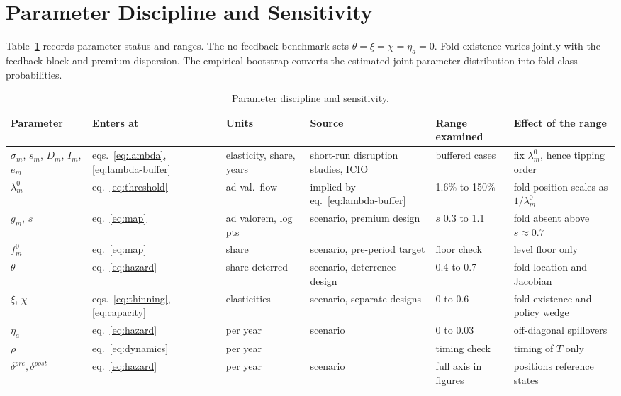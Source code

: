 \documentclass[11pt]{article}
\theoremstyle{definition}
\begin{document}
\section{Parameter Discipline and Sensitivity}\label{app:params}

Table~\ref{tab:params3} records parameter status and ranges. The no-feedback benchmark sets $\theta=\xi=\chi=\eta_a=0$. Fold existence varies jointly with the feedback block and premium dispersion. The empirical bootstrap converts the estimated joint parameter distribution into fold-class probabilities.

\begin{table}[h]
\centering
\caption{Parameter discipline and sensitivity.}
\label{tab:params3}
\footnotesize
\setlength{\tabcolsep}{3.5pt}
\begin{tabular}{p{2.2cm}p{1.7cm}p{1.5cm}p{2.9cm}p{1.9cm}p{3.2cm}}
\toprule
Parameter & Enters at & Units & Source & Range examined & Effect of the range \\
\midrule
$\sigma_m$, $s_m$, $D_m$, $I_m$, $e_m$ & eqs.~\eqref{eq:lambda}, \eqref{eq:lambda-buffer} & elasticity, share, years & short-run disruption studies, ICIO & buffered cases & fix $\lambda^0_m$, hence tipping order \\
$\lambda^0_m$ & eq.~\eqref{eq:threshold} & ad val.\ flow & implied by eq.~\eqref{eq:lambda-buffer} & 1.6\% to 150\% & fold position scales as $1/\lambda^0_m$ \\
$\bar g_m$, $s$ & eq.~\eqref{eq:map} & ad valorem, log pts & scenario, premium design & $s$ 0.3 to 1.1 & fold absent above $s\approx0.7$ \\
$f^0_m$ & eq.~\eqref{eq:map} & share & scenario, pre-period target & floor check & level floor only \\
$\theta$ & eq.~\eqref{eq:hazard} & share deterred & scenario, deterrence design & 0.4 to 0.7 & fold location and Jacobian \\
$\xi$, $\chi$ & eqs.~\eqref{eq:thinning}, \eqref{eq:capacity} & elasticities & scenario, separate designs & 0 to 0.6 & fold existence and policy wedge \\
$\eta_a$ & eq.~\eqref{eq:hazard} & per year & scenario & 0 to 0.03 & off-diagonal spillovers \\
$\rho$ & eq.~\eqref{eq:dynamics} & per year & \citet{BarrotSauvagnat2016} & timing check & timing of $\bar T$ only \\
$\delta^{pre}, \delta^{post}$ & eq.~\eqref{eq:hazard} & per year & scenario & full axis in figures & positions reference states \\

\end{tabular}
\end{table}
\end{document}
